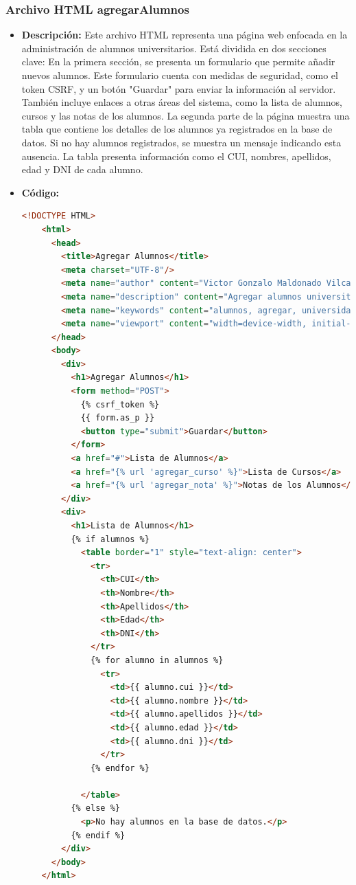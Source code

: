 \documentclass{article}
\begin{document}
  \subsubsection{Archivo HTML agregarAlumnos}
  \begin{itemize}
    \item \textbf{Descripción: }Este archivo HTML representa una página web enfocada en la administración de alumnos universitarios. 
    Está dividida en dos secciones clave:
    \newline
    En la primera sección, se presenta un formulario que permite añadir nuevos alumnos. Este formulario cuenta con medidas de 
    seguridad, como el token CSRF, y un botón "Guardar" para enviar la información al servidor. También incluye enlaces a otras 
    áreas del sistema, como la lista de alumnos, cursos y las notas de los alumnos.
    \newline
    La segunda parte de la página muestra una tabla que contiene los detalles de los alumnos ya registrados en la base de datos. 
    Si no hay alumnos registrados, se muestra un mensaje indicando esta ausencia. La tabla presenta información como el CUI, 
    nombres, apellidos, edad y DNI de cada alumno.
    \item \textbf{Código: }
    \begin{lstlisting}[language=html, caption={HTML agregarAlumnos}]
    <!DOCTYPE HTML>
    <html>
      <head>
        <title>Agregar Alumnos</title>
        <meta charset="UTF-8"/>
        <meta name="author" content="Victor Gonzalo Maldonado Vilca"/>
        <meta name="description" content="Agregar alumnos universitarios"/>
        <meta name="keywords" content="alumnos, agregar, universidad"/>
        <meta name="viewport" content="width=device-width, initial-scale=1.0"/>
      </head>
      <body>
        <div>
          <h1>Agregar Alumnos</h1>
          <form method="POST">
            {% csrf_token %}
            {{ form.as_p }}
            <button type="submit">Guardar</button>
          </form>
          <a href="#">Lista de Alumnos</a>
          <a href="{% url 'agregar_curso' %}">Lista de Cursos</a>
          <a href="{% url 'agregar_nota' %}">Notas de los Alumnos</a>
        </div>
        <div>
          <h1>Lista de Alumnos</h1>
          {% if alumnos %}
            <table border="1" style="text-align: center">
              <tr>
                <th>CUI</th>
                <th>Nombre</th>
                <th>Apellidos</th>
                <th>Edad</th>
                <th>DNI</th>
              </tr>
              {% for alumno in alumnos %}
                <tr>
                  <td>{{ alumno.cui }}</td>
                  <td>{{ alumno.nombre }}</td>
                  <td>{{ alumno.apellidos }}</td>
                  <td>{{ alumno.edad }}</td>
                  <td>{{ alumno.dni }}</td>
                </tr>
              {% endfor %}
            
            </table>
          {% else %}
            <p>No hay alumnos en la base de datos.</p>
          {% endif %}
        </div>
      </body>
    </html>
    \end{lstlisting}
  \end{itemize}
  
\end{document}
